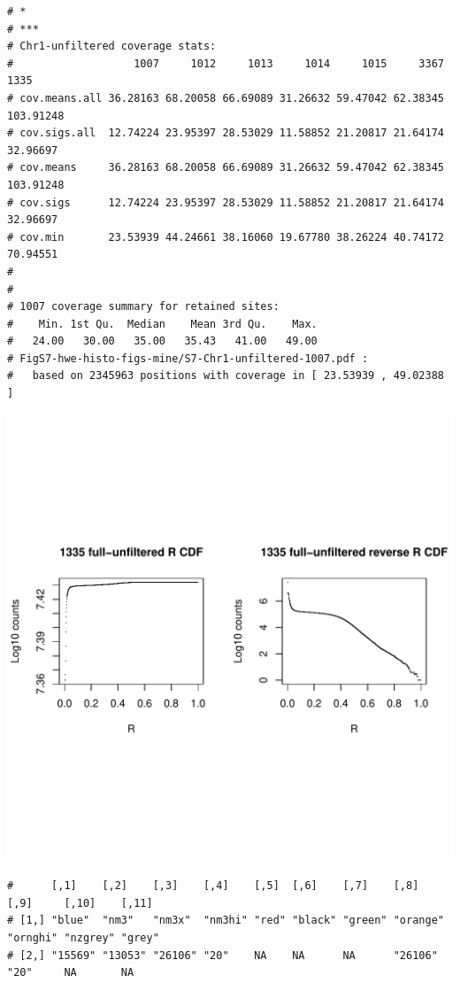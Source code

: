 \documentclass{article}\usepackage[]{graphicx}\usepackage[]{color}
\makeatletter
\def\maxwidth{ %
  \ifdim\Gin@nat@width>\linewidth
    \linewidth
  \else
    \Gin@nat@width
  \fi
}
\newenvironment{kframe}{%
 \def\at@end@of@kframe{}%
 \ifinner\ifhmode%
  \def\at@end@of@kframe{\end{minipage}}%
  \begin{minipage}{\columnwidth}%
 \fi\fi%
 \def\FrameCommand##1{\hskip\@totalleftmargin \hskip-\fboxsep
 \colorbox{shadecolor}{##1}\hskip-\fboxsep
     \hskip-\linewidth \hskip-\@totalleftmargin \hskip\columnwidth}%
 \MakeFramed {\advance\hsize-\width
   \@totalleftmargin\z@ \linewidth\hsize
   \@setminipage}}%
 {\par\unskip\endMakeFramed%
 \at@end@of@kframe}
\newenvironment{knitrout}{}{} %
\makeatother
\begin{document}
\begin{knitrout}
\begin{kframe}
\begin{verbatim}
# *
# ***
# Chr1-unfiltered coverage stats:
#                   1007     1012     1013     1014     1015     3367      1335
# cov.means.all 36.28163 68.20058 66.69089 31.26632 59.47042 62.38345 103.91248
# cov.sigs.all  12.74224 23.95397 28.53029 11.58852 21.20817 21.64174  32.96697
# cov.means     36.28163 68.20058 66.69089 31.26632 59.47042 62.38345 103.91248
# cov.sigs      12.74224 23.95397 28.53029 11.58852 21.20817 21.64174  32.96697
# cov.min       23.53939 44.24661 38.16060 19.67780 38.26224 40.74172  70.94551
# 
# 
# 1007 coverage summary for retained sites:
#    Min. 1st Qu.  Median    Mean 3rd Qu.    Max. 
#   24.00   30.00   35.00   35.43   41.00   49.00 
# FigS7-hwe-histo-figs-mine/S7-Chr1-unfiltered-1007.pdf :
#   based on 2345963 positions with coverage in [ 23.53939 , 49.02388 ]
\end{verbatim}
\end{kframe}
\includegraphics[width=\maxwidth]{FigS7-hwe-histo-figs-knitr/unnamed-chunk-10-14} 
\begin{kframe}\begin{verbatim}
#      [,1]    [,2]    [,3]    [,4]    [,5]  [,6]    [,7]    [,8]     [,9]     [,10]    [,11] 
# [1,] "blue"  "nm3"   "nm3x"  "nm3hi" "red" "black" "green" "orange" "ornghi" "nzgrey" "grey"
# [2,] "15569" "13053" "26106" "20"    NA    NA      NA      "26106"  "20"     NA       NA    

\end{verbatim}
\end{kframe}
\end{knitrout}
\end{document}
